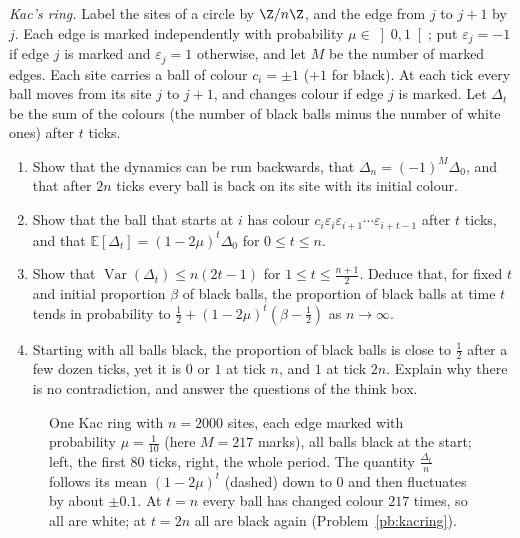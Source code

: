 \begin{exercise}[$\star\star$]\label{pb:kacring}
\emph{Kac's ring.} Label the sites of a circle by $\Z/n\Z$, and the edge from $j$ to $j+1$ by $j$. Each edge is marked independently with
probability $\mu\in\left]0,1\right[$; put $\varepsilon_j=-1$ if edge $j$ is marked and $\varepsilon_j=1$ otherwise, and let $M$ be the number of marked edges. Each site carries a
ball of colour $c_i=\pm1$ ($+1$ for black). At each tick every ball moves from its site $j$ to $j+1$, and changes colour if edge $j$ is
marked. Let $\Delta_t$ be the sum of the colours (the number of black balls minus the number of white ones) after $t$ ticks.
\begin{enumerate}[label=(\alph*)]
\item Show that the dynamics can be run backwards, that $\Delta_n=(-1)^M\Delta_0$, and that after $2n$ ticks every ball is back on its site with
its initial colour.
\item Show that the ball that starts at $i$ has colour $c_i\varepsilon_i\varepsilon_{i+1}\cdots\varepsilon_{i+t-1}$ after $t$ ticks, and that $\mathbb E[\Delta_t]=(1-2\mu)^t\Delta_0$ for $0\le t\le n$.
\item Show that $\operatorname{Var}(\Delta_t)\le n(2t-1)$ for $1\le t\le\frac{n+1}2$. Deduce that, for fixed $t$ and initial proportion $\beta$ of black balls, the
proportion of black balls at time $t$ tends in probability to $\frac12+(1-2\mu)^t(\beta-\frac12)$ as $n\to\infty$.
\item Starting with all balls black, the proportion of black balls is close to $\frac12$ after a few dozen ticks, yet it is $0$ or $1$ at
tick $n$, and $1$ at tick $2n$. Explain why there is no contradiction, and answer the questions of the think box.
\end{enumerate}
\end{exercise}

\begin{figure}[ht]
\centering
{}
\caption{One Kac ring with $n=2000$ sites, each edge marked with probability $\mu=\frac1{10}$ (here $M=217$ marks), all balls black at the start; left, the
first $80$ ticks, right, the whole period. The quantity $\frac{\Delta_t}n$ follows its mean $(1-2\mu)^t$ (dashed) down to $0$ and then fluctuates by about $\pm0.1$. At $t=n$ every ball has changed colour $217$ times, so all
are white; at $t=2n$ all are black again (Problem~\ref{pb:kacring}).}
\label{fig:kacring}
\end{figure}

